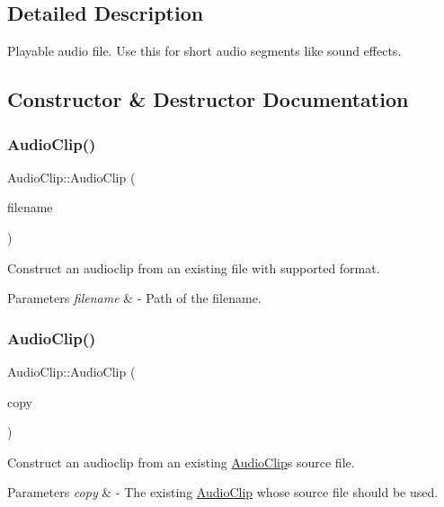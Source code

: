 \subsection{Detailed Description}
Playable audio file. Use this for short audio segments like sound effects. 

\subsection{Constructor \& Destructor Documentation}
\mbox{\label{class_audio_clip_a92cb3dceab020f54290b05b1ae5de974}} 
\subsubsection{\texorpdfstring{Audio\+Clip()}{AudioClip()}\hspace{0.1cm}{\footnotesize\ttfamily [1/3]}}
{\footnotesize\ttfamily Audio\+Clip\+::\+Audio\+Clip (\begin{DoxyParamCaption}\item[{std\+::string}]{filename }\end{DoxyParamCaption})}

Construct an audioclip from an existing file with supported format. 
\begin{DoxyParams}{Parameters}
{\em filename} & -\/ Path of the filename. \\
\hline
\end{DoxyParams}
\mbox{\label{class_audio_clip_ac5664fc84d17e5e31c1daacdec89b3cf}} 
\subsubsection{\texorpdfstring{Audio\+Clip()}{AudioClip()}\hspace{0.1cm}{\footnotesize\ttfamily [2/3]}}
{\footnotesize\ttfamily Audio\+Clip\+::\+Audio\+Clip (\begin{DoxyParamCaption}\item[{const \mbox{\hyperlink{class_audio_clip}{Audio\+Clip}} \&}]{copy }\end{DoxyParamCaption})}

Construct an audioclip from an existing \mbox{\hyperlink{class_audio_clip}{Audio\+Clip}}\textquotesingle{}s source file. 
\begin{DoxyParams}{Parameters}
{\em copy} & -\/ The existing \mbox{\hyperlink{class_audio_clip}{Audio\+Clip}} whose source file should be used. \\
\hline
\end{DoxyParams}
\mbox{\label{class_audio_clip_a0a4d351823548e0f54625c37db221c82}} 
